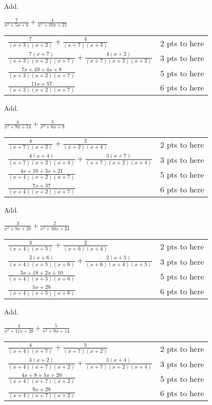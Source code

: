 {
	Add.\par
	$\displaystyle\frac{7}{x^2+5x+6} + \frac{4}{x^2+10x+21}$
}
{
	\begin{tabular}{l r}
	$\frac{7}{(x+3)(x+2)} + \frac{4}{(x+7)(x+3)}$ & 2 pts to here\\
	$\frac{7(x+7)}{(x+3)(x+2)(x+7)} + \frac{4(x+2)}{(x+7)(x+3)(x+2)}$& 3 pts to here\\
	$\frac{7x+49+4x+8}{(x+3)(x+2)(x+7)}$ & 5 pts to here\\
	$\frac{11x+57}{(x+3)(x+2)(x+7)}$ & 6 pts to here
	\end{tabular}
}

{
	Add.\par
	$\displaystyle\frac{4}{x^2+9x+14} + \frac{3}{x^2+6x+8}$
}
{
	\begin{tabular}{l r}
	$\frac{4}{(x+7)(x+2)} + \frac{3}{(x+2)(x+4)}$ & 2 pts to here\\
	$\frac{4(x+4)}{(x+7)(x+2)(x+4)} + \frac{3(x+7)}{(x+7)(x+2)(x+4)}$& 3 pts to here\\
	$\frac{4x+16+3x+21}{(x+4)(x+2)(x+7)}$ & 5 pts to here\\
	$\frac{7x+37}{(x+4)(x+2)(x+7)}$ & 6 pts to here
	\end{tabular}
}

{
	Add.\par
	$\displaystyle\frac{3}{x^2+9x+20} + \frac{2}{x^2+10x+24}$
}
{
	\begin{tabular}{l r}
	$\frac{3}{(x+4)(x+5)} + \frac{2}{(x+6)(x+4)}$ & 2 pts to here\\
	$\frac{3(x+6)}{(x+4)(x+5)(x+6)} + \frac{2(x+5)}{(x+6)(x+4)(x+5)}$& 3 pts to here\\
	$\frac{3x+18+2x+10}{(x+4)(x+5)(x+6)}$ & 5 pts to here\\
	$\frac{5x+28}{(x+4)(x+5)(x+6)}$ & 6 pts to here
	\end{tabular}
}

{
	Add.\par
	$\displaystyle\frac{4}{x^2+11x+28} + \frac{5}{x^2+9x+14}$
}
{
	\begin{tabular}{l r}
	$\frac{4}{(x+4)(x+7)} + \frac{5}{(x+7)(x+2)}$ & 2 pts to here\\
	$\frac{4(x+2)}{(x+4)(x+7)(x+2)} + \frac{5(x+4)}{(x+7)(x+2)(x+4)}$& 3 pts to here\\
	$\frac{4x+8+5x+20}{(x+4)(x+7)(x+2)}$ & 5 pts to here\\
	$\frac{9x+28}{(x+4)(x+7)(x+2)}$ & 6 pts to here
	\end{tabular}
}
